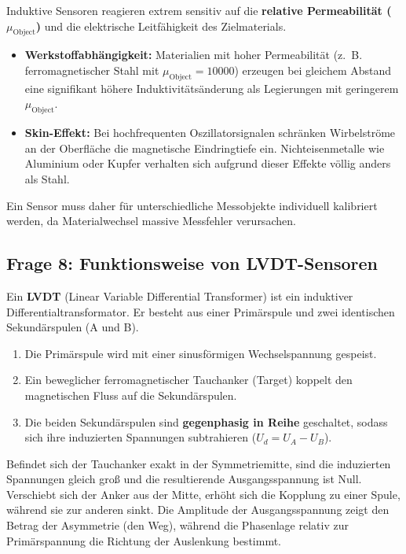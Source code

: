 \documentclass[12pt,a4paper]{article}
\begin{document}
Induktive Sensoren reagieren extrem sensitiv auf die \textbf{relative Permeabilität ($\mu_{\text{Object}}$)} und die elektrische Leitfähigkeit des Zielmaterials. 

\begin{itemize}
    \item \textbf{Werkstoffabhängigkeit:} Materialien mit hoher Permeabilität (z.~B. ferromagnetischer Stahl mit $\mu_{\text{Object}} = 10000$) erzeugen bei gleichem Abstand eine signifikant höhere Induktivitätsänderung als Legierungen mit geringerem $\mu_{\text{Object}}$. 
    \item \textbf{Skin-Effekt:} Bei hochfrequenten Oszillatorsignalen schränken Wirbelströme an der Oberfläche die magnetische Eindringtiefe ein. Nichteisenmetalle wie Aluminium oder Kupfer verhalten sich aufgrund dieser Effekte völlig anders als Stahl.
\end{itemize}
Ein Sensor muss daher für unterschiedliche Messobjekte individuell kalibriert werden, da Materialwechsel massive Messfehler verursachen.

\subsection*{Frage 8: Funktionsweise von LVDT-Sensoren}

Ein \textbf{LVDT} (Linear Variable Differential Transformer) ist ein induktiver Differentialtransformator. Er besteht aus einer Primärspule und zwei identischen Sekundärspulen (A und B). 

\begin{enumerate}
    \item Die Primärspule wird mit einer sinusförmigen Wechselspannung gespeist.
    \item Ein beweglicher ferromagnetischer Tauchanker (Target) koppelt den magnetischen Fluss auf die Sekundärspulen.
    \item Die beiden Sekundärspulen sind \textbf{gegenphasig in Reihe} geschaltet, sodass sich ihre induzierten Spannungen subtrahieren ($U_d = U_A - U_B$).
\end{enumerate}
Befindet sich der Tauchanker exakt in der Symmetriemitte, sind die induzierten Spannungen gleich groß und die resultierende Ausgangsspannung ist Null. Verschiebt sich der Anker aus der Mitte, erhöht sich die Kopplung zu einer Spule, während sie zur anderen sinkt. Die Amplitude der Ausgangsspannung zeigt den Betrag der Asymmetrie (den Weg), während die Phasenlage relativ zur Primärspannung die Richtung der Auslenkung bestimmt.
\end{document}
